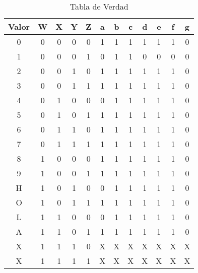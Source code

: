   \begin{table}[H]
    \begin{center}
      \begin{tabular}{ c ||| c  c  c  c ||| c | c | c | c | c | c | c}
        \toprule
        Valor & W & X & Y & Z & a & b & c & d & e & f & g \\
        \toprule
        0    &    0 & 0 & 0 & 0    &    1 & 1 & 1 & 1 & 1 & 1 & 0 \\
        1    &    0 & 0 & 0 & 1    &    0 & 1 & 1 & 0 & 0 & 0 & 0 \\
        2    &    0 & 0 & 1 & 0    &    1 & 1 & 1 & 1 & 1 & 1 & 0 \\
        3    &    0 & 0 & 1 & 1    &    1 & 1 & 1 & 1 & 1 & 1 & 0 \\
        \midrule
        4    &    0 & 1 & 0 & 0    &    0 & 1 & 1 & 1 & 1 & 1 & 0 \\
        5    &    0 & 1 & 0 & 1    &    1 & 1 & 1 & 1 & 1 & 1 & 0 \\
        6    &    0 & 1 & 1 & 0    &    1 & 1 & 1 & 1 & 1 & 1 & 0 \\
        7    &    0 & 1 & 1 & 1    &    1 & 1 & 1 & 1 & 1 & 1 & 0 \\
        \midrule
        8    &    1 & 0 & 0 & 0    &    1 & 1 & 1 & 1 & 1 & 1 & 0 \\
        9    &    1 & 0 & 0 & 1    &    1 & 1 & 1 & 1 & 1 & 1 & 0 \\
        H    &    1 & 0 & 1 & 0    &    0 & 1 & 1 & 1 & 1 & 1 & 0 \\
        O    &    1 & 0 & 1 & 1    &    1 & 1 & 1 & 1 & 1 & 1 & 0 \\
        \midrule
        L    &    1 & 1 & 0 & 0    &    0 & 1 & 1 & 1 & 1 & 1 & 0 \\
        A    &    1 & 1 & 0 & 1    &    1 & 1 & 1 & 1 & 1 & 1 & 0 \\
        X    &    1 & 1 & 1 & 0    &    X & X & X & X & X & X & X \\
        X    &    1 & 1 & 1 & 1    &    X & X & X & X & X & X & X \\
        \bottomrule
      \end{tabular}
      \label{tab:verdad}
      \caption{Tabla de Verdad}
    \end{center}
  \end{table}


